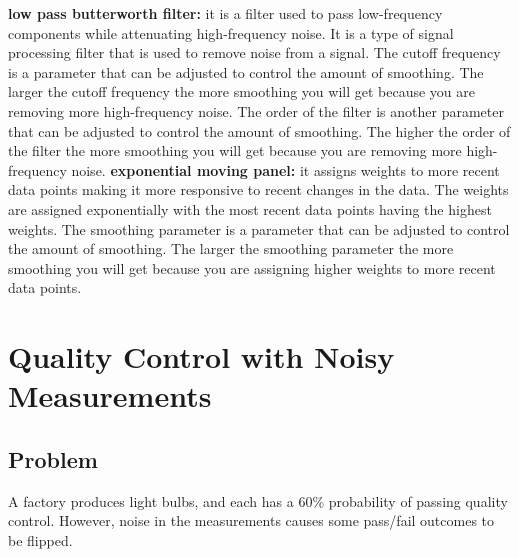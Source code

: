 \documentclass[a4paper,12pt]{article} %
\begin{document}
\newline\newline
\textbf{low pass butterworth filter:} it is a filter used to pass low-frequency components while attenuating high-frequency noise. It is a type of signal processing filter that is used to remove noise from a signal. The cutoff frequency is a parameter that can be adjusted to control the amount of smoothing. The larger the cutoff frequency the more smoothing you will get because you are removing more high-frequency noise. The order of the filter is another parameter that can be adjusted to control the amount of smoothing. The higher the order of the filter the more smoothing you will get because you are removing more high-frequency noise. 
\newline\newline
\textbf{exponential moving panel:} it assigns weights to more recent data points making it more responsive to recent changes in the data. The weights are assigned exponentially with the most recent data points having the highest weights. The smoothing parameter is a parameter that can be adjusted to control the amount of smoothing. The larger the smoothing parameter the more smoothing you will get because you are assigning higher weights to more recent data points.
\section{Quality Control with Noisy Measurements}
\subsection{Problem}
A factory produces light bulbs, and each has a 60\% probability of passing
quality control. However, noise in the measurements causes some pass/fail outcomes to
be flipped.
\end{document}

